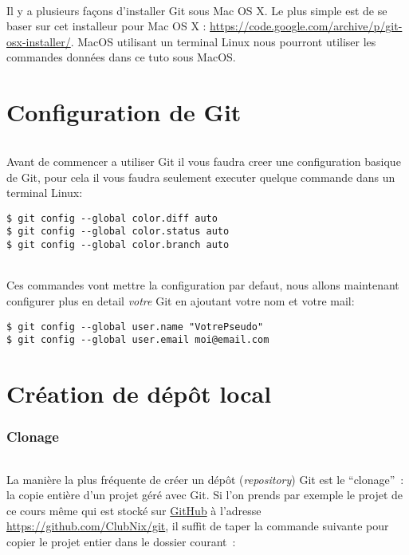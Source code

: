 \documentclass[french, a4paper, 12pt, titlepage]{article}
\begin{document}
\paragraph{}Il y a plusieurs façons d’installer Git sous Mac OS X. Le plus simple est de se baser sur cet installeur pour Mac OS X : \url{https://code.google.com/archive/p/git-osx-installer/}. MacOS utilisant un terminal Linux nous pourront utiliser les commandes données dans ce tuto sous MacOS.

\part{Configuration de Git}
\paragraph{}Avant de commencer a utiliser Git il vous faudra creer une configuration basique de Git, pour cela il vous faudra seulement executer quelque commande dans un terminal Linux:
\begin{lstlisting}
$ git config --global color.diff auto
$ git config --global color.status auto
$ git config --global color.branch auto
\end{lstlisting}
\paragraph{}Ces commandes vont mettre la configuration par defaut, nous allons maintenant configurer plus en detail \emph{votre} Git en ajoutant votre nom et votre mail:
\begin{lstlisting}
$ git config --global user.name "VotrePseudo"
$ git config --global user.email moi@email.com
\end{lstlisting}


\part{Création de dépôt local}

\section{Clonage}

\paragraph{} La manière la plus fréquente de créer un dépôt
(\emph{repository}) Git est le ``clonage''~: la copie entière d'un projet géré avec Git. Si l'on prends par exemple le projet de ce cours même qui est stocké sur \href{https://github.com}{GitHub} à l'adresse
\url{https://github.com/ClubNix/git}, il suffit de taper la commande suivante pour copier le projet entier dans le dossier courant~:
\end{document}
